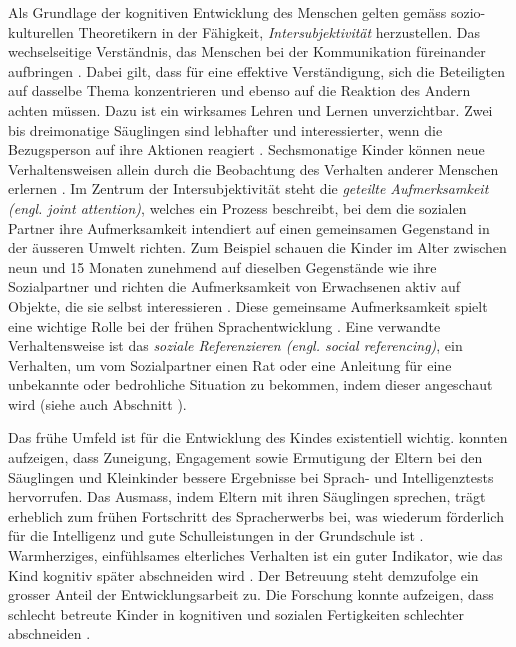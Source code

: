 Als Grundlage der kognitiven Entwicklung des Menschen gelten gemäss sozio-kulturellen Theoretikern in der Fähigkeit, \textit{Intersubjektivität} herzustellen. Das wechselseitige Verständnis, das Menschen bei der Kommunikation füreinander aufbringen \cite{Gauvain2001, Rogoff1990}. Dabei gilt, dass für eine effektive Verständigung, sich die Beteiligten auf dasselbe Thema konzentrieren und ebenso auf die Reaktion des Andern achten müssen. Dazu ist ein wirksames Lehren und Lernen unverzichtbar. Zwei bis dreimonatige Säuglingen sind lebhafter und interessierter, wenn die Bezugsperson auf ihre Aktionen reagiert \cite{Murray1985}. Sechsmonatige Kinder können neue Verhaltensweisen allein durch die Beobachtung des Verhalten anderer Menschen erlernen \cite{Collie1999}. Im Zentrum der Intersubjektivität steht die \textit{geteilte Aufmerksamkeit (engl. joint attention)}, welches ein Prozess beschreibt, bei dem die sozialen Partner ihre Aufmerksamkeit intendiert auf einen gemeinsamen Gegenstand in der äusseren Umwelt richten. Zum Beispiel schauen die Kinder im Alter zwischen neun und 15 Monaten zunehmend auf dieselben Gegenstände wie ihre Sozialpartner und richten die Aufmerksamkeit von Erwachsenen aktiv auf Objekte, die sie selbst interessieren \cite{Adamson1991, Gauvain2001}. Diese gemeinsame Aufmerksamkeit spielt eine wichtige Rolle bei der frühen Sprachentwicklung \cite[S.~232]{Berk2011}. Eine verwandte Verhaltensweise ist das \textit{soziale Referenzieren (engl. social referencing)}, ein Verhalten, um vom Sozialpartner einen Rat oder eine Anleitung für eine unbekannte oder bedrohliche Situation zu bekommen, indem dieser angeschaut wird \cite{Campos1981} (siehe auch Abschnitt \textit{}). 

Das frühe Umfeld ist für die Entwicklung des Kindes existentiell wichtig.  konnten aufzeigen, dass Zuneigung, Engagement sowie Ermutigung der Eltern bei den Säuglingen und Kleinkinder bessere Ergebnisse bei Sprach- und Intelligenztests hervorrufen. Das Ausmass, indem Eltern mit ihren Säuglingen sprechen, trägt erheblich zum frühen Fortschritt des Spracherwerbs bei, was wiederum förderlich für die Intelligenz und gute Schulleistungen in der Grundschule ist \cite{Hart1995}. Warmherziges, einfühlsames elterliches Verhalten ist ein guter Indikator, wie das Kind kognitiv später abschneiden wird \cite[S.~225]{Berk2011}. Der Betreuung steht demzufolge ein grosser Anteil der Entwicklungsarbeit zu. Die Forschung konnte aufzeigen, dass schlecht betreute Kinder in kognitiven und sozialen Fertigkeiten schlechter abschneiden \cite{NICHD2006}.

